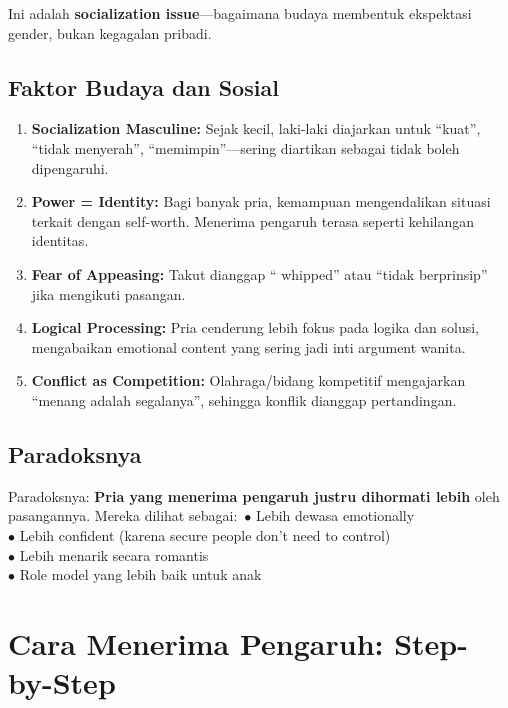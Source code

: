 \begin{warningbox}
Ini adalah \textbf{socialization issue}---bagaimana budaya membentuk ekspektasi gender, bukan kegagalan pribadi.
\end{warningbox}

\subsection{Faktor Budaya dan Sosial}

\begin{enumerate}[leftmargin=*]
    \item \textbf{Socialization Masculine:} Sejak kecil, laki-laki diajarkan untuk ``kuat'', ``tidak menyerah'', ``memimpin''---sering diartikan sebagai tidak boleh dipengaruhi.
    
    \item \textbf{Power = Identity:} Bagi banyak pria, kemampuan mengendalikan situasi terkait dengan self-worth. Menerima pengaruh terasa seperti kehilangan identitas.
    
    \item \textbf{Fear of Appeasing:} Takut dianggap `` whipped'' atau ``tidak berprinsip'' jika mengikuti pasangan.
    
    \item \textbf{Logical Processing:} Pria cenderung lebih fokus pada logika dan solusi, mengabaikan emotional content yang sering jadi inti argument wanita.
    
    \item \textbf{Conflict as Competition:} Olahraga/bidang kompetitif mengajarkan ``menang adalah segalanya'', sehingga konflik dianggap pertandingan.
\end{enumerate}

\subsection{Paradoksnya}

Paradoksnya: \textbf{Pria yang menerima pengaruh justru dihormati lebih} oleh pasangannya. Mereka dilihat sebagai:\
$\bullet$ Lebih dewasa emotionally\\
$\bullet$ Lebih confident (karena secure people don't need to control)\\
$\bullet$ Lebih menarik secara romantis\\
$\bullet$ Role model yang lebih baik untuk anak

\section{Cara Menerima Pengaruh: Step-by-Step}

